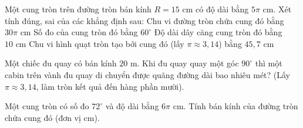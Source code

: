 \begin{ex}%
	Một cung tròn trên đường tròn bán kính $R = 15\text{ cm}$ có độ dài bằng $5\pi\text{ cm}$. Xét tính đúng, sai của các khẳng định sau:
	\choiceTF
	{\True Chu vi đường tròn chứa cung đó bằng $30\pi\text{ cm}$}
	{\True Số đo của cung tròn đó bằng $60^\circ$}
	{Độ dài dây căng cung tròn đó bằng $10\text{ cm}$}
	{\True Chu vi hình quạt tròn tạo bởi cung đó (lấy $\pi \approx 3{,}14$) bằng $45{,}7\text{ cm}$}
\end{ex}

\begin{bt}%
	Một chiếc đu quay có bán kính $20\text{ m}$. Khi đu quay quay một góc $90^\circ$ thì một cabin trên vành đu quay di chuyển được quãng đường dài bao nhiêu mét? (Lấy $\pi \approx 3{,}14$, làm tròn kết quả đến hàng phần mười).
\end{bt}

\begin{bt}%
	Một cung tròn có số đo $72^\circ$ và độ dài bằng $6\pi\text{ cm}$. Tính bán kính của đường tròn chứa cung đó (đơn vị cm).
\end{bt}


